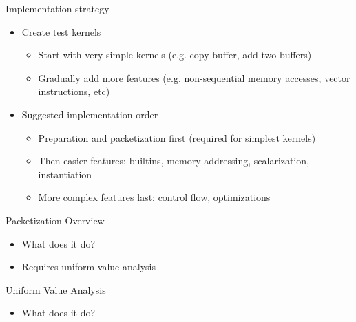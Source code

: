 \begin{frame}{Implementation strategy}

\begin{itemize}
    \item Create test kernels
    \begin{itemize}
        \item Start with very simple kernels (e.g. copy buffer, add two buffers)
        \item Gradually add more features (e.g. non-sequential memory accesses, vector instructions, etc)
    \end{itemize}
    
    \item Suggested implementation order
    \begin{itemize}
        \item Preparation and packetization first (required for simplest kernels)
        \item Then easier features: builtins, memory addressing, scalarization, instantiation
        \item More complex features last: control flow, optimizations
    \end{itemize}
\end{itemize}

\end{frame}



\begin{frame}{Packetization Overview}

\begin{itemize}
    \item What does it do?
    \item Requires uniform value analysis
\end{itemize}

\end{frame}


\begin{frame}{Uniform Value Analysis}

\begin{itemize}
    \item What does it do?
\end{itemize}

\end{frame}

